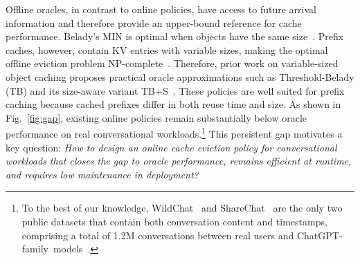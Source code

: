 \documentclass{article}
\newcommand{\jiny}[1]{\textcolor{orange}{[Jiny: #1]}}
\begin{document}
Offline oracles, in contrast to online policies, have access to future arrival information and therefore provide an upper-bound reference for cache performance. Belady's MIN is optimal when objects have the same size~\cite{belady1966study}. Prefix caches, however, contain KV entries with variable sizes, making the optimal offline eviction problem NP-complete~\cite{chrobak2012caching}. Therefore, prior work on variable-sized object caching proposes practical oracle approximations such as Threshold-Belady (TB) and its size-aware variant TB+S~\cite{246346}. These policies are well suited for prefix caching because cached prefixes differ in both reuse time and size. As shown in Fig.~\ref{fig:gap}, existing online policies remain substantially below oracle performance on real conversational workloads.\footnote{To the best of our knowledge, WildChat~\cite{zhao2024wildchat} and ShareChat~\cite{yan2025sharechat} are the only two public datasets that contain both conversation content and timestamps, comprising a total of 1.2M conversations between real users and ChatGPT-family~models~\cite{chatgpt2026}.} This persistent gap motivates a key question: \emph{How to design an online cache eviction policy for conversational workloads that closes the gap to oracle performance, remains efficient at runtime, and requires low maintenance in deployment?}







\end{document}
